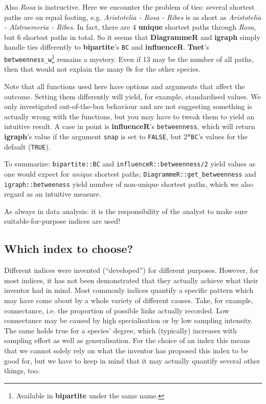 \documentclass[a4paper, 11pt]{article}\usepackage[]{graphicx}\usepackage[dvipsnames]{xcolor}
\newcommand{\package}[1]{\textbf{#1}}
\newcommand{\code}[1]{\texttt{#1}}
\begin{document}
Also \emph{Rosa} is instructive. Here we encounter the problem of ties: several shortest paths are on equal footing, e.g. \emph{Aristotelia - Rosa - Ribes} is as short as \emph{Aristotelia - Alstroemeria - Ribes}. In fact, there are 4 \textbf{unique} shortest paths through \emph{Rosa}, but 6 shortest paths in total. So it seems that \package{DiagrammeR} and \package{igraph} simply handle ties differently to \package{bipartite}'s \code{BC} and \package{influenceR}. \package{Tnet}'s \code{betweenness\_w}\footnote{Available in \package{bipartite} under the same name.} remains a mystery. Even if 13 may be the number of all paths, then that would not explain the many 0s for the other species.

Note that all functions used here have options and arguments that affect the outcome. Setting them differently will yield, for example, standardised values. We only investigated out-of-the-box behaviour and are not suggesting something is actually wrong with the functions, but you may have to tweak them to yield an intuitive result. A case in point is \package{influenceR}'s \code{betweenness}, which will return \package{igraph}'s value if the argument \texttt{snap} is set to \code{FALSE}, but 2*\code{BC}'s values for the default (\code{TRUE}).

To summarize: \code{bipartite::BC} and \code{influenceR::betweenness/2} yield values as one would expect for \emph{unique} shortest paths; \code{DiagrammeR::get\_betweenness} and \code{igraph::betweeness} yield number of non-unique shortest paths, which we also regard as an intuitive measure. 

As always in data analysis: it is the responsibility of the analyst to make sure suitable-for-purpose indices are used!


\subsection{Which index to choose?}%
Different indices were invented (``developed'') for different purposes. However, for most indices, it has not been demonstrated that they actually achieve what their inventor had in mind. Most commonly indices quantify a specific pattern which may have come about by a whole variety of different causes. Take, for example, connectance, i.e. the proportion of possible links actually recorded. Low connectance may be caused by high specialisation or by low sampling intensity. The same holds true for a species' degree, which (typically) increases with sampling effort as well as generalisation. For the choice of an index this means that we cannot solely rely on what the inventor has proposed this index to be good for, but we have to keep in mind that it may actually quantify several other things, too.
\end{document}
